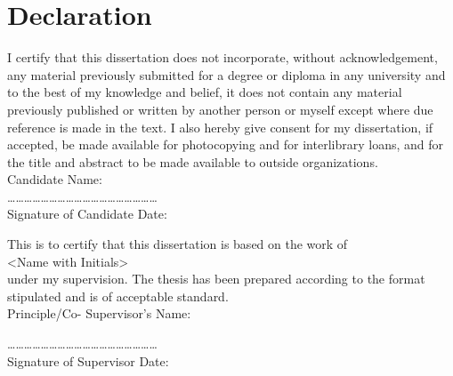 \chapter*{Declaration}

I certify that this dissertation does not incorporate, without acknowledgement, any material previously submitted for a degree or diploma in any university and to the best of my knowledge and belief, it does not contain any material previously published or written by another person or myself except where due reference is made in the text. I also hereby give consent for my dissertation, if accepted, be made available for photocopying and for interlibrary loans, and for the title and abstract to be made available to outside organizations. \\

Candidate Name: \\

……………………………………………… \\
Signature of Candidate \hspace{6cm}Date:  

\hfill\break

This is to certify that this dissertation is based on the work of \\

\textless Name with Initials\textgreater{} \\

under my supervision. The thesis has been prepared according to the format stipulated and is of acceptable standard. \\

Principle/Co- Supervisor’s Name: 

\hfill\break

……………………………………………… \\
Signature of Supervisor \hspace{6cm}Date:  
